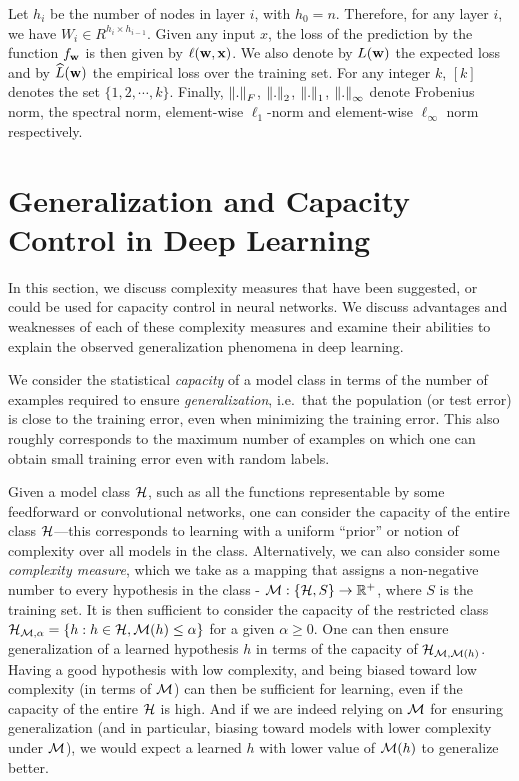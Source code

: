 \documentclass{article}
\begin{document}

Let $h_i$ be the number of nodes in layer $i$, with $h_0
=n$. Therefore, for any layer $i$, we have $W_i\in R^{h_{i}\times
  h_{i-1}}$. Given any input $x$, the loss of the prediction by the
function $f_{\mathbf{w}}$ is then given by $\ell(\mathbf{w},\mathbf{x})$. We also
denote by $L(\mathbf{w})$ the expected loss and by $\widehat{L}(\mathbf{w})$ the
empirical loss over the training set. For any integer $k$, $[k]$
denotes the set $\{ 1, 2, \cdots, k\}$. Finally, $\left\lVert{.}\right\rVert_F$,
$\left\lVert{.}\right\rVert_2$, $\left\lVert{.}\right\rVert_1$, $\left\lVert{.}\right\rVert_\infty$ denote Frobenius norm,
the spectral norm, element-wise $\ell_1$-norm and element-wise
$\ell_\infty$ norm respectively.

\section{Generalization and Capacity Control in Deep Learning}\label{sec:summary}
In this section, we discuss complexity measures that have been
suggested, or could be used for capacity control in neural networks.
We discuss advantages and weaknesses of each of these complexity
measures and examine their abilities to explain the observed
generalization phenomena in deep learning.

We consider the statistical {\em capacity} of a model class in terms
of the number of examples required to ensure {\em generalization},
i.e.~that the population (or test error) is close to the training
error, even when minimizing the training error.  This also roughly
corresponds to the maximum number of examples on which one can obtain
small training error even with random labels.

Given a model class $\mathcal{H}$, such as all the functions representable by
some feedforward or convolutional networks, one can consider the
capacity of the entire class $\mathcal{H}$---this corresponds to learning
with a uniform ``prior'' or notion of complexity over all models in
the class.  Alternatively, we can also consider some {\em complexity
  measure}, which we take as a mapping that assigns a non-negative
number to every hypothesis in the class - $\mathcal{M}: \{ \mathcal{H}, S \}
\rightarrow \mathbb{R}^+$, where $S$ is the training set.  It is then sufficient to consider the capacity
of the restricted class $\mathcal{H}_{\mathcal{M},\alpha}=\{h: h\in \mathcal{H},
\mathcal{M}(h) \leq \alpha\}$ for a given $\alpha \geq 0$.  One can then
ensure generalization of a learned hypothesis $h$ in terms of the
capacity of $\mathcal{H}_{\mathcal{M},\mathcal{M}(h)}$.  Having a good hypothesis with
low complexity, and being biased toward low complexity (in terms of
$\mathcal{M}$) can then be sufficient for learning, even if the capacity of
the entire $\mathcal{H}$ is high.  And if we are indeed relying on $\mathcal{M}$
for ensuring generalization (and in particular, biasing toward models
with lower complexity under $\mathcal{M}$), we would expect a learned $h$
with lower value of $\mathcal{M}(h)$ to generalize better.
\end{document}
